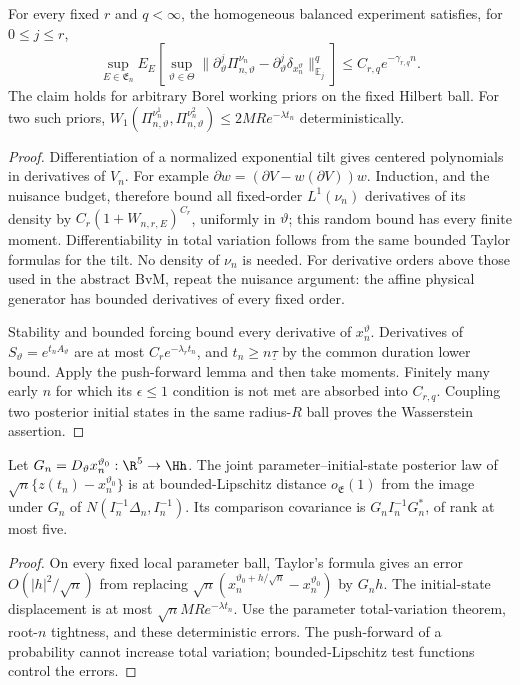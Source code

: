 \begin{theorem}
\label{thm:filter-jets}
For every fixed \(r\) and \(q<\infty\), the homogeneous balanced experiment
satisfies, for \(0\le j\le r\),
\begin{equation}
 \sup_{E\in\mathfrak E_n}E_E\left[
 \sup_{\vartheta\in\Theta}
 \|\partial_\vartheta^j\Pi_{n,\vartheta}^{\nu_n}
       -\partial_\vartheta^j\delta_{x_n^\vartheta}\|_{\mathbb E_j}^q\right]
 \le C_{r,q}e^{-\gamma_{r,q}n}.
 \label{eq:filter-jet-decay}
\end{equation}
The claim holds for arbitrary Borel working priors on the fixed Hilbert
ball. For two such priors,
\(W_1(\Pi_{n,\vartheta}^{\nu_n^1},\Pi_{n,\vartheta}^{\nu_n^2})
 \le2MR e^{-\lambda t_n}\) deterministically.
\end{theorem}
\begin{proof}
Differentiation of a normalized exponential tilt gives centered
polynomials in derivatives of \(V_n\). For example
\(\partial w=(\partial V-w(\partial V))w\).
Induction, and the nuisance budget, therefore bound all fixed-order
\(L^1(\nu_n)\) derivatives of its density by
\(C_r(1+W_{n,r,E})^{C_r}\), uniformly in \(\vartheta\); this random
bound has every finite moment. Differentiability in total variation
follows from the same bounded Taylor formulas for the tilt. No density
of \(\nu_n\) is needed. For derivative orders above those used in the
abstract BvM, repeat the nuisance argument: the affine physical generator
has bounded derivatives of every fixed order.

Stability and bounded forcing bound every derivative of \(x_n^\vartheta\).
Derivatives of \(S_\vartheta=e^{t_nA_\vartheta}\) are at most
\(C_re^{-\lambda_rt_n}\), and \(t_n\ge n\underline\tau\) by the
common duration lower bound. Apply the push-forward lemma and then take
moments. Finitely many early \(n\) for which its \(\epsilon\le1\)
condition is not met are absorbed into \(C_{r,q}\). Coupling two
posterior initial states in the same radius-\(R\) ball proves the
Wasserstein assertion.
\end{proof}

\begin{corollary}
\label{cor:state-image}
Let \(G_n=D_\vartheta x_n^{\vartheta_0}:\R^5\to\Hh\). The joint
parameter--initial-state posterior law of
\(\sqrt n\{z(t_n)-x_n^{\vartheta_0}\}\) is at bounded-Lipschitz distance
\(o_{\mathfrak E}(1)\) from the image under \(G_n\) of
\(N(I_n^{-1}\Delta_n,I_n^{-1})\). Its comparison covariance is
\(G_n I_n^{-1}G_n^*\), of rank at most five.
\end{corollary}
\begin{proof}
On every fixed local parameter ball, Taylor's formula gives an error
\(O(|h|^2/\sqrt n)\) from replacing
\(\sqrt n(x_n^{\vartheta_0+h/\sqrt n}-x_n^{\vartheta_0})\) by \(G_nh\).
The initial-state displacement is at most \(\sqrt nMR e^{-\lambda t_n}\).
Use the parameter total-variation theorem, root-\(n\) tightness, and these
deterministic errors. The push-forward of a probability cannot increase
total variation; bounded-Lipschitz test functions control the errors.
\end{proof}

